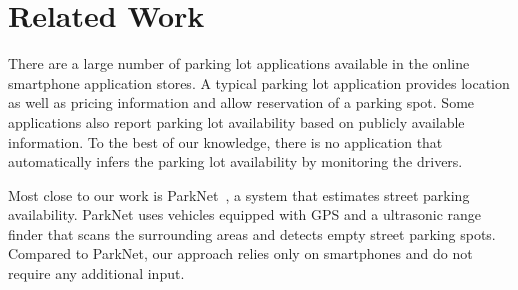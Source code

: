 \section{Related Work}
\label{sec-related}

There are a large number of parking lot applications available in the online
smartphone application stores. A typical parking lot application provides
location as well as pricing information and allow reservation of a parking spot.
Some applications also report parking lot availability based on publicly
available information. To the best of our knowledge, there is no application
that automatically infers the parking lot availability by monitoring the
drivers.

Most close to our work is ParkNet~\cite{Mathur:2010:PDS}, a system that
estimates street parking availability. ParkNet uses vehicles equipped with GPS
and a ultrasonic range finder that scans the surrounding areas and detects
empty street parking spots. Compared to ParkNet, our approach relies only on
smartphones and do not require any additional input.


